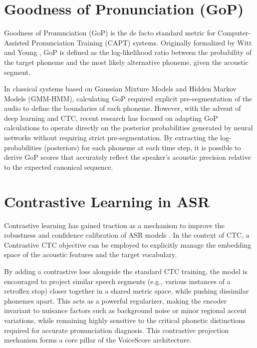 \section{Goodness of Pronunciation (GoP)}
Goodness of Pronunciation (GoP) is the de facto standard metric for Computer-Assisted Pronunciation Training (CAPT) systems. Originally formalized by Witt and Young \cite{witt2000gop}, GoP is defined as the log-likelihood ratio between the probability of the target phoneme and the most likely alternative phoneme, given the acoustic segment. 

In classical systems based on Gaussian Mixture Models and Hidden Markov Models (GMM-HMM), calculating GoP required explicit pre-segmentation of the audio to define the boundaries of each phoneme. However, with the advent of deep learning and CTC, recent research has focused on adapting GoP calculations to operate directly on the posterior probabilities generated by neural networks without requiring strict pre-segmentation. By extracting the log-probabilities (posteriors) for each phoneme at each time step, it is possible to derive GoP scores that accurately reflect the speaker's acoustic precision relative to the expected canonical sequence.

\section{Contrastive Learning in ASR}
Contrastive learning has gained traction as a mechanism to improve the robustness and confidence calibration of ASR models \cite{drexler2023contrastive}. In the context of CTC, a Contrastive CTC objective can be employed to explicitly manage the embedding space of the acoustic features and the target vocabulary. 

By adding a contrastive loss alongside the standard CTC training, the model is encouraged to project similar speech segments (e.g., various instances of a retroflex stop) closer together in a shared metric space, while pushing dissimilar phonemes apart. This acts as a powerful regularizer, making the encoder invariant to nuisance factors such as background noise or minor regional accent variations, while remaining highly sensitive to the critical phonetic distinctions required for accurate pronunciation diagnosis. This contrastive projection mechanism forms a core pillar of the VoiceScore architecture.

